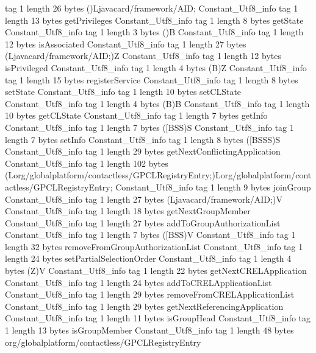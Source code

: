 {{{			tag	1
			length	26
			bytes	()Ljavacard/framework/AID;
		}
		Constant_Utf8_info {
			tag	1
			length	13
			bytes	getPrivileges
		}
		Constant_Utf8_info {
			tag	1
			length	8
			bytes	getState
		}
		Constant_Utf8_info {
			tag	1
			length	3
			bytes	()B
		}
		Constant_Utf8_info {
			tag	1
			length	12
			bytes	isAssociated
		}
		Constant_Utf8_info {
			tag	1
			length	27
			bytes	(Ljavacard/framework/AID;)Z
		}
		Constant_Utf8_info {
			tag	1
			length	12
			bytes	isPrivileged
		}
		Constant_Utf8_info {
			tag	1
			length	4
			bytes	(B)Z
		}
		Constant_Utf8_info {
			tag	1
			length	15
			bytes	registerService
		}
		Constant_Utf8_info {
			tag	1
			length	8
			bytes	setState
		}
		Constant_Utf8_info {
			tag	1
			length	10
			bytes	setCLState
		}
		Constant_Utf8_info {
			tag	1
			length	4
			bytes	(B)B
		}
		Constant_Utf8_info {
			tag	1
			length	10
			bytes	getCLState
		}
		Constant_Utf8_info {
			tag	1
			length	7
			bytes	getInfo
		}
		Constant_Utf8_info {
			tag	1
			length	7
			bytes	([BSS)S
		}
		Constant_Utf8_info {
			tag	1
			length	7
			bytes	setInfo
		}
		Constant_Utf8_info {
			tag	1
			length	8
			bytes	([BSSS)S
		}
		Constant_Utf8_info {
			tag	1
			length	29
			bytes	getNextConflictingApplication
		}
		Constant_Utf8_info {
			tag	1
			length	102
			bytes	(Lorg/globalplatform/contactless/GPCLRegistryEntry;)Lorg/globalplatform/contactless/GPCLRegistryEntry;
		}
		Constant_Utf8_info {
			tag	1
			length	9
			bytes	joinGroup
		}
		Constant_Utf8_info {
			tag	1
			length	27
			bytes	(Ljavacard/framework/AID;)V
		}
		Constant_Utf8_info {
			tag	1
			length	18
			bytes	getNextGroupMember
		}
		Constant_Utf8_info {
			tag	1
			length	27
			bytes	addToGroupAuthorizationList
		}
		Constant_Utf8_info {
			tag	1
			length	7
			bytes	([BSS)V
		}
		Constant_Utf8_info {
			tag	1
			length	32
			bytes	removeFromGroupAuthorizationList
		}
		Constant_Utf8_info {
			tag	1
			length	24
			bytes	setPartialSelectionOrder
		}
		Constant_Utf8_info {
			tag	1
			length	4
			bytes	(Z)V
		}
		Constant_Utf8_info {
			tag	1
			length	22
			bytes	getNextCRELApplication
		}
		Constant_Utf8_info {
			tag	1
			length	24
			bytes	addToCRELApplicationList
		}
		Constant_Utf8_info {
			tag	1
			length	29
			bytes	removeFromCRELApplicationList
		}
		Constant_Utf8_info {
			tag	1
			length	29
			bytes	getNextReferencingApplication
		}
		Constant_Utf8_info {
			tag	1
			length	11
			bytes	isGroupHead
		}
		Constant_Utf8_info {
			tag	1
			length	13
			bytes	isGroupMember
		}
		Constant_Utf8_info {
			tag	1
			length	48
			bytes	org/globalplatform/contactless/GPCLRegistryEntry
}}}

